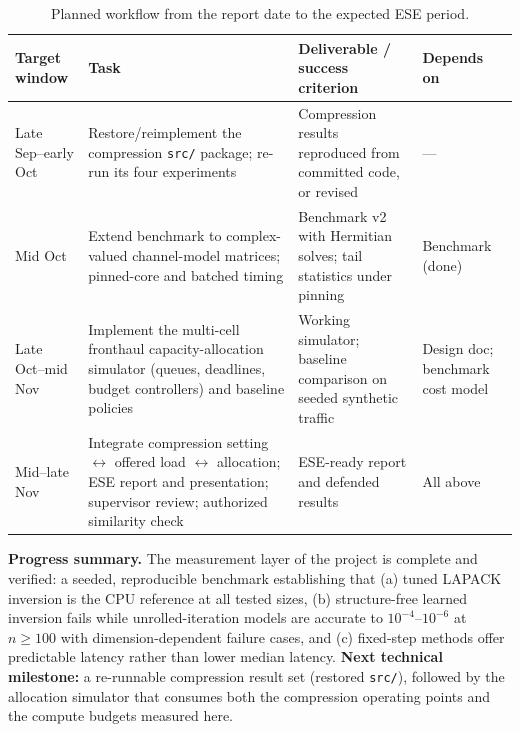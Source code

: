 \documentclass[11pt,a4paper]{article}
\begin{document}
\begin{table}[h]
\centering
\small
\caption{Planned workflow from the report date to the expected ESE period.}
\label{tab:plan}
\begin{tabular}{@{}p{2.6cm} p{5.7cm} p{4.6cm} p{2.6cm}@{}}
\toprule
Target window & Task & Deliverable / success criterion & Depends on \\
\midrule
Late Sep--early Oct & Restore/reimplement the compression \texttt{src/} package; re-run its four experiments & Compression results reproduced from committed code, or revised & --- \\
Mid Oct & Extend benchmark to complex-valued channel-model matrices; pinned-core and batched timing & Benchmark v2 with Hermitian solves; tail statistics under pinning & Benchmark (done) \\
Late Oct--mid Nov & Implement the multi-cell fronthaul capacity-allocation simulator (queues, deadlines, budget controllers) and baseline policies & Working simulator; baseline comparison on seeded synthetic traffic & Design doc; benchmark cost model \\
Mid--late Nov & Integrate compression setting $\leftrightarrow$ offered load $\leftrightarrow$ allocation; ESE report and presentation; supervisor review; authorized similarity check & ESE-ready report and defended results & All above \\
\bottomrule
\end{tabular}
\end{table}

\textbf{Progress summary.} The measurement layer of the project is complete
and verified: a seeded, reproducible benchmark establishing that (a) tuned
LAPACK inversion is the CPU reference at all tested sizes, (b) structure-free
learned inversion fails while unrolled-iteration models are accurate to
$10^{-4}$--$10^{-6}$ at $n \ge 100$ with dimension-dependent failure cases, and
(c) fixed-step methods offer predictable latency rather than lower median
latency. \textbf{Next technical milestone:} a re-runnable compression
result set (restored \texttt{src/}), followed by the allocation simulator
that consumes both the compression operating points and the compute budgets
measured here.
\end{document}
